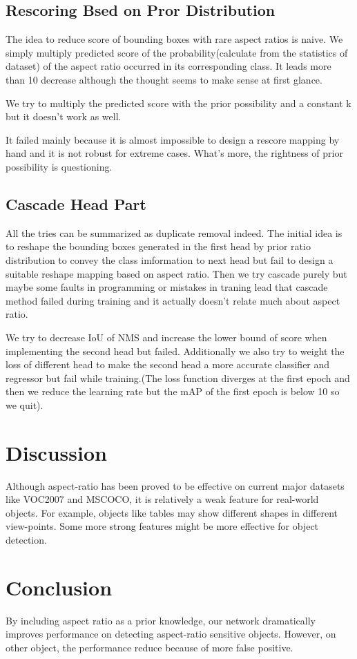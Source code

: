 \documentclass[10pt,twocolumn,letterpaper]{article}
\begin{document}
\subsection{Rescoring Bsed on Pror Distribution}
The idea to reduce score of bounding boxes with rare aspect ratios is naive. We simply multiply predicted score of the probability(calculate from the statistics of dataset) of the aspect ratio occurred in its corresponding class. It leads more than 10 decrease although the thought seems to make sense at first glance.
\par
We try to multiply the predicted score with the prior possibility and a constant k but it doesn't work as well.
\par
It failed mainly because it is almost impossible to design a rescore mapping by hand and it is not robust for extreme cases. What's more, the rightness of prior possibility is questioning.

\subsection{Cascade Head Part}
\par
All the tries can be summarized as duplicate removal indeed. The initial idea is to reshape the bounding boxes generated in the first head by prior ratio distribution to convey the class imformation to next head but fail to design a suitable reshape mapping based on aspect ratio. Then we try cascade purely but maybe some faults in programming or mistakes in traning lead that cascade method failed during training and it actually doesn't relate much about aspect ratio.
\par
We try to decrease IoU of NMS and increase the lower bound of score when implementing the second head but failed. Additionally we also try to weight the loss of different head to make the second head a more accurate classifier and regressor but fail while training.(The loss function diverges at the first epoch and then we reduce the learning rate but the mAP of the first epoch is below 10 so we quit).


\section{Discussion}
\par
Although aspect-ratio has been proved to be effective on current major datasets like VOC2007 and MSCOCO, it is relatively a weak feature for real-world objects. For example, objects like tables may show different shapes in different view-points. Some more strong features might be more effective for object detection.  

\section{Conclusion}
By including aspect ratio as a prior knowledge, our network dramatically improves performance on detecting aspect-ratio sensitive objects. However, on other object, the performance reduce because of more false positive.

{\small


}
\end{document}
